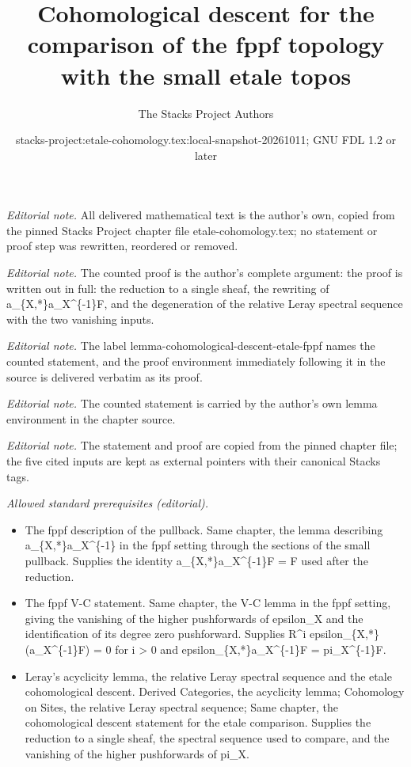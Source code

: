\documentclass[10pt,a4paper]{amsart}
\title{Cohomological descent for the comparison of the fppf topology with the small etale topos}
\author{The Stacks Project Authors}
\date{stacks-project:etale-cohomology.tex:local-snapshot-20261011; GNU FDL 1.2 or later}
\theoremstyle{plain}
\theoremstyle{definition}
\theoremstyle{remark}
\numberwithin{equation}{subsection}
\begin{document}
\maketitle
\noindent\textit{Editorial note.} All delivered mathematical text is the author's own, copied from the pinned Stacks Project chapter file etale-cohomology.tex; no statement or proof step was rewritten, reordered or removed.\par\medskip
\noindent\textit{Editorial note.} The counted proof is the author's complete argument: the proof is written out in full: the reduction to a single sheaf, the rewriting of a\_\{X,*\}a\_X\textasciicircum{}\{-1\}F, and the degeneration of the relative Leray spectral sequence with the two vanishing inputs.\par\medskip
\noindent\textit{Editorial note.} The label lemma-cohomological-descent-etale-fppf names the counted statement, and the proof environment immediately following it in the source is delivered verbatim as its proof.\par\medskip
\noindent\textit{Editorial note.} The counted statement is carried by the author's own lemma environment in the chapter source.\par\medskip
\noindent\textit{Editorial note.} The statement and proof are copied from the pinned chapter file; the five cited inputs are kept as external pointers with their canonical Stacks tags.\par\medskip
\noindent\textit{Allowed standard prerequisites (editorial).}\begin{itemize}
\item The fppf description of the pullback. Same chapter, the lemma describing a\_\{X,*\}a\_X\textasciicircum{}\{-1\} in the fppf setting through the sections of the small pullback. Supplies the identity a\_\{X,*\}a\_X\textasciicircum{}\{-1\}F = F used after the reduction.
\item The fppf V-C statement. Same chapter, the V-C lemma in the fppf setting, giving the vanishing of the higher pushforwards of epsilon\_X and the identification of its degree zero pushforward. Supplies R\textasciicircum{}i epsilon\_\{X,*\}(a\_X\textasciicircum{}\{-1\}F) = 0 for i > 0 and epsilon\_\{X,*\}a\_X\textasciicircum{}\{-1\}F = pi\_X\textasciicircum{}\{-1\}F.
\item Leray's acyclicity lemma, the relative Leray spectral sequence and the etale cohomological descent. Derived Categories, the acyclicity lemma; Cohomology on Sites, the relative Leray spectral sequence; Same chapter, the cohomological descent statement for the etale comparison. Supplies the reduction to a single sheaf, the spectral sequence used to compare, and the vanishing of the higher pushforwards of pi\_X.
\end{itemize}\medskip
\end{document}
